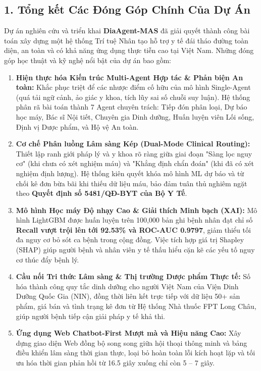 \documentclass[12pt,a4paper]{article}
\begin{document}
\subsection*{1. Tổng kết Các Đóng Góp Chính Của Dự Án}
Dự án nghiên cứu và triển khai \textbf{DiaAgent-MAS} đã giải quyết thành công bài toán xây dựng một hệ thống Trí tuệ Nhân tạo hỗ trợ y tế đái tháo đường toàn diện, an toàn và có khả năng ứng dụng thực tiễn cao tại Việt Nam. Những đóng góp học thuật và kỹ nghệ nổi bật của dự án bao gồm:
\begin{enumerate}[leftmargin=1.2cm]
    \item \textbf{Hiện thực hóa Kiến trúc Multi-Agent Hợp tác \& Phản biện An toàn:} Khắc phục triệt để các nhược điểm cố hữu của mô hình Single-Agent (quá tải ngữ cảnh, ảo giác y khoa, tích lũy sai số chuỗi suy luận). Hệ thống phân rã bài toán thành 7 Agent chuyên trách: Tiếp đón phân loại, Dự báo học máy, Bác sĩ Nội tiết, Chuyên gia Dinh dưỡng, Huấn luyện viên Lối sống, Định vị Dược phẩm, và Hộ vệ An toàn.
    \item \textbf{Cơ chế Phân luồng Lâm sàng Kép (Dual-Mode Clinical Routing):} Thiết lập ranh giới pháp lý và y khoa rõ ràng giữa giai đoạn "Sàng lọc nguy cơ" (khi chưa có xét nghiệm máu) và "Khẳng định chẩn đoán" (khi đã có xét nghiệm định lượng). Hệ thống kiên quyết khóa mô hình ML dự báo và từ chối kê đơn bừa bãi khi thiếu dữ liệu máu, bảo đảm tuân thủ nghiêm ngặt theo \textbf{Quyết định số 5481/QĐ-BYT của Bộ Y Tế}.
    \item \textbf{Mô hình Học máy Độ nhạy Cao \& Giải thích Minh bạch (XAI):} Mô hình LightGBM được huấn luyện trên 100,000 bản ghi bệnh nhân đạt chỉ số \textbf{Recall vượt trội lên tới 92.53\% và ROC-AUC 0.9797}, giảm thiểu tối đa nguy cơ bỏ sót ca bệnh trong cộng đồng. Việc tích hợp giá trị Shapley (SHAP) giúp người bệnh và nhân viên y tế thấu hiểu cặn kẽ các yếu tố nguy cơ thúc đẩy bệnh lý.
    \item \textbf{Cầu nối Tri thức Lâm sàng \& Thị trường Dược phẩm Thực tế:} Số hóa thành công quy tắc dinh dưỡng cho người Việt Nam của Viện Dinh Dưỡng Quốc Gia (NIN), đồng thời liên kết trực tiếp với dữ liệu 50+ sản phẩm, giá bán và tình trạng kê đơn từ Hệ thống Nhà thuốc FPT Long Châu, giúp người bệnh tiếp cận giải pháp y tế khả thi.
    \item \textbf{Ứng dụng Web Chatbot-First Mượt mà và Hiệu năng Cao:} Xây dựng giao diện Web đồng bộ song song giữa hội thoại thông minh và bảng điều khiển lâm sàng thời gian thực, loại bỏ hoàn toàn lỗi kích hoạt lặp và tối ưu hóa thời gian phản hồi từ 16.5 giây xuống chỉ còn 5 -- 7 giây.
\end{enumerate}
\end{document}

